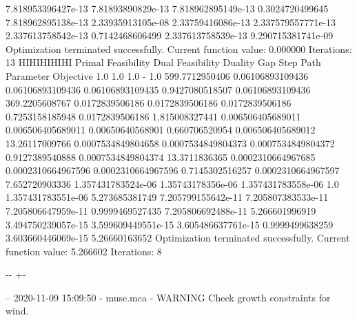 \documentclass[letterpaper,10pt,english]{sphinxmanual}
\newlength\nbsphinxcodecellspacing
\begin{document}
{\begin{sphinxVerbatim}[commandchars=\\\{\}]
7.818953396427e-13  7.81893890829e-13   7.818962895149e-13  0.3024720499645  7.818962895138e-13  2.33935913105e-08
2.33759416086e-13   2.337579557771e-13  2.337613758542e-13  0.7142468606499  2.337613758539e-13  9.290715381741e-09
Optimization terminated successfully.
         Current function value: 0.000000
         Iterations: 13
HIHIHIHIHI
Primal Feasibility  Dual Feasibility    Duality Gap         Step             Path Parameter      Objective
1.0                 1.0                 1.0                 -                1.0                 599.7712950406
0.06106893109436    0.06106893109436    0.06106893109435    0.9427080518507  0.06106893109436    369.2205608767
0.0172839506186     0.0172839506186     0.0172839506186     0.7253158185948  0.0172839506186     1.815008327441
0.006506405689011   0.006506405689011   0.00650640568901    0.660706520954   0.006506405689012   13.26117009766
0.0007534849804658  0.0007534849804373  0.0007534849804372  0.9127389540888  0.0007534849804374  13.3711836365
0.0002310664967685  0.0002310664967596  0.0002310664967596  0.7145302516257  0.0002310664967597  7.652720903336
1.357431783524e-06  1.35743178356e-06   1.357431783558e-06  1.0              1.357431783551e-06  5.273685381749
7.205799155642e-11  7.205807383533e-11  7.205806647959e-11  0.9999469527435  7.205806692488e-11  5.266601996919
3.494750239057e-15  3.599609449551e-15  3.605486637761e-15  0.9999499638259  3.603660446069e-15  5.26660163652
Optimization terminated successfully.
         Current function value: 5.266602
         Iterations: 8
\end{sphinxVerbatim}
}

{

\kern-\sphinxverbatimsmallskipamount\kern-\baselineskip
\kern+\FrameHeightAdjust\kern-\fboxrule
\vspace{\nbsphinxcodecellspacing}

\begin{sphinxVerbatim}[commandchars=\\\{\}]
-- 2020-11-09 15:09:50 - muse.mca - WARNING
Check growth constraints for wind.

\end{sphinxVerbatim}
}
\end{document}
